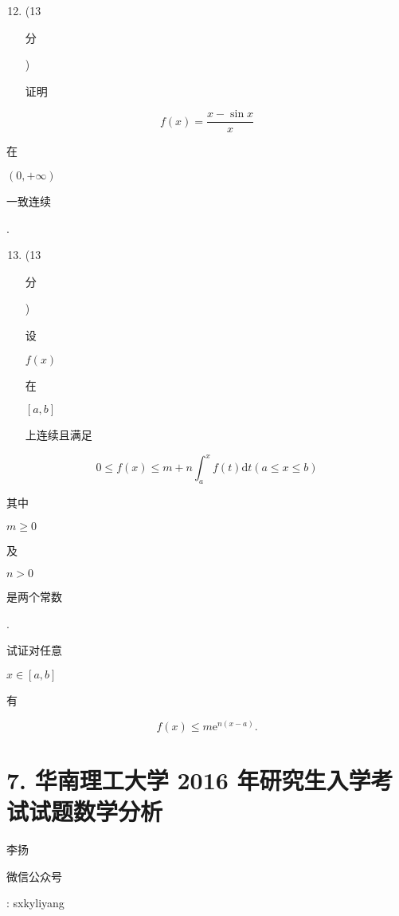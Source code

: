 \documentclass[10pt]{article}
\begin{document}
\begin{enumerate}
  \setcounter{enumi}{11}
  \item (13 \begin{CJK}{UTF8}{mj}分\end{CJK}) \begin{CJK}{UTF8}{mj}证明\end{CJK}
\end{enumerate}
$$
f(x)=\frac{x-\sin x}{x}
$$
\begin{CJK}{UTF8}{mj}在\end{CJK} $(0,+\infty)$ \begin{CJK}{UTF8}{mj}一致连续\end{CJK}.

\begin{enumerate}
  \setcounter{enumi}{12}
  \item (13 \begin{CJK}{UTF8}{mj}分\end{CJK}) \begin{CJK}{UTF8}{mj}设\end{CJK} $f(x)$ \begin{CJK}{UTF8}{mj}在\end{CJK} $[a, b]$ \begin{CJK}{UTF8}{mj}上连续且满足\end{CJK}
\end{enumerate}
$$
0 \leq f(x) \leq m+n \int_{a}^{x} f(t) \mathrm{d} t(a \leq x \leq b)
$$
\begin{CJK}{UTF8}{mj}其中\end{CJK} $m \geq 0$ \begin{CJK}{UTF8}{mj}及\end{CJK} $n>0$ \begin{CJK}{UTF8}{mj}是两个常数\end{CJK}. \begin{CJK}{UTF8}{mj}试证对任意\end{CJK} $x \in[a, b]$ \begin{CJK}{UTF8}{mj}有\end{CJK}
$$
f(x) \leq m \mathrm{e}^{n(x-a)} .
$$

\section{7. 华南理工大学 2016 年研究生入学考试试题数学分析}
\begin{CJK}{UTF8}{mj}李扬\end{CJK}

\begin{CJK}{UTF8}{mj}微信公众号\end{CJK}: sxkyliyang
\end{document}
